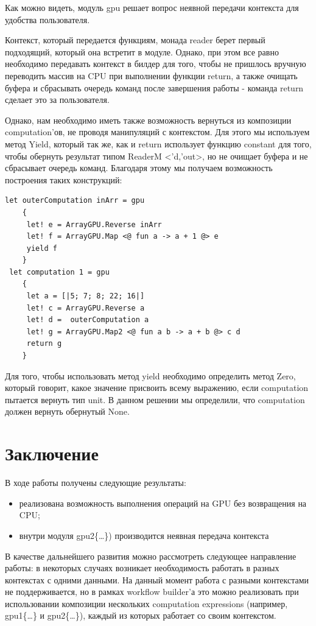 \documentclass[14pt]{matmex-diploma}
\begin{document}
Как можно видеть, модуль gpu решает вопрос неявной передачи контекста для удобства пользователя.

Контекст, который передается функциям, монада reader берет первый подходящий, который она встретит в модуле. 
Однако, при этом все равно необходимо передавать контекст в билдер для того, чтобы не пришлось вручную переводить массив на CPU при выполнении функции return, а также очищать буфера и сбрасывать очередь команд после завершения работы - команда return сделает это за пользователя.

Однако, нам необходимо иметь также возможность вернуться из композиции computation’ов, не проводя манипуляций с контекстом. Для этого мы используем метод Yield, который так же, как и return использует функцию constant для того, чтобы обернуть результат типом ReaderM <’d,’out>, но не очищает буфера и не сбрасывает очередь команд.
Благодаря этому мы получаем возможность построения таких конструкций:
\begin{verbatim}
let outerComputation inArr = gpu 
    {                             
     let! e = ArrayGPU.Reverse inArr
     let! f = ArrayGPU.Map <@ fun a -> a + 1 @> e
     yield f
    }    
 let computation 1 = gpu 
    { 
     let a = [|5; 7; 8; 22; 16|]             
     let! c = ArrayGPU.Reverse a
     let! d =  outerComputation a
     let! g = ArrayGPU.Map2 <@ fun a b -> a + b @> c d
     return g
    } 

\end{verbatim}
Для того, чтобы использовать метод yield необходимо определить метод Zero, который говорит, какое значение присвоить всему выражению, если computation пытается вернуть тип unit. В данном решении мы определили, что computation должен вернуть обернутый None.

\section*{Заключение}
В ходе работы получены следующие результаты:
\begin{itemize}
    \item реализована возможность выполнения операций на GPU без возвращения на CPU;
    \item внутри модуля gpu2\{\ldots\}) производится неявная передача контекста 
\end{itemize}

В качестве дальнейшего развития можно рассмотреть следующее направление работы: в некоторых случаях возникает необходимость работать в разных контекстах с одними данными. На данный момент работа с разными контекстами не поддерживается, но в рамках workflow builder’а это можно реализовать при использовании композиции нескольких computation expressions (например, gpu1\{\ldots\} и gpu2\{\ldots\}), каждый из которых работает со своим контекстом. 

\setmonofont[Mapping=tex-text]{CMU Typewriter Text}


\end{document}
